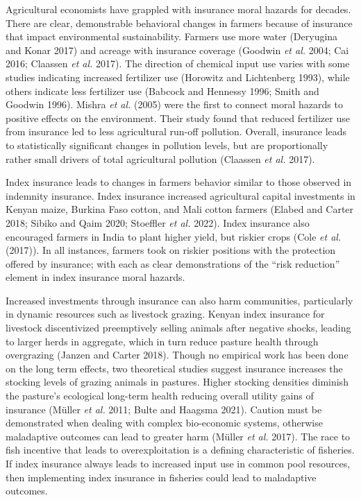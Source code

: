\documentclass[
  letterpaper,
  DIV=11,
  numbers=noendperiod]{scrartcl}
\theoremstyle{plain}
\theoremstyle{plain}
\theoremstyle{remark}
\begin{document}
Agricultural economists have grappled with insurance moral hazards for
decades. There are clear, demonstrable behavioral changes in farmers
because of insurance that impact environmental sustainability. Farmers
use more water (Deryugina and Konar 2017) and acreage with insurance
coverage (Goodwin \emph{et al.} 2004; Cai 2016; Claassen \emph{et al.}
2017). The direction of chemical input use varies with some studies
indicating increased fertilizer use (Horowitz and Lichtenberg 1993),
while others indicate less fertilizer use (Babcock and Hennessy 1996;
Smith and Goodwin 1996). Mishra \emph{et al.} (2005) were the first to
connect moral hazards to positive effects on the environment. Their
study found that reduced fertilizer use from insurance led to less
agricultural run-off pollution. Overall, insurance leads to
statistically significant changes in pollution levels, but are
proportionally rather small drivers of total agricultural pollution
(Claassen \emph{et al.} 2017).

Index insurance leads to changes in farmers behavior similar to those
observed in indemnity insurance. Index insurance increased agricultural
capital investments in Kenyan maize, Burkina Faso cotton, and Mali
cotton farmers (Elabed and Carter 2018; Sibiko and Qaim 2020; Stoeffler
\emph{et al.} 2022). Index insurance also encouraged farmers in India to
plant higher yield, but riskier crops (Cole \emph{et al.} (2017)). In
all instances, farmers took on riskier positions with the protection
offered by insurance; with each as clear demonstrations of the ``risk
reduction'' element in index insurance moral hazards.

Increased investments through insurance can also harm communities,
particularly in dynamic resources such as livestock grazing. Kenyan
index insurance for livestock discentivized preemptively selling animals
after negative shocks, leading to larger herds in aggregate, which in
turn reduce pasture health through overgrazing (Janzen and Carter 2018).
Though no empirical work has been done on the long term effects, two
theoretical studies suggest insurance increases the stocking levels of
grazing animals in pastures. Higher stocking densities diminish the
pasture's ecological long-term health reducing overall utility gains of
insurance (Müller \emph{et al.} 2011; Bulte and Haagsma 2021). Caution
must be demonstrated when dealing with complex bio-economic systems,
otherwise maladaptive outcomes can lead to greater harm (Müller \emph{et
al.} 2017). The race to fish incentive that leads to overexploitation is
a defining characteristic of fisheries. If index insurance always leads
to increased input use in common pool resources, then implementing index
insurance in fisheries could lead to maladaptive outcomes.
\end{document}
